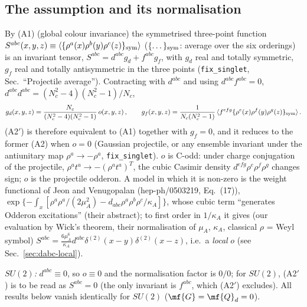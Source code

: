 \subsection{The assumption and its normalisation}\label{sec:dabc-ass}
\noindent By (A1) (global colour invariance) the symmetrised three-point function $S^{abc}(x,y,z)\equiv\langle\{\rho^{a}(x)\rho^{b}(y)\rho^{c}(z)\}_{\rm sym}\rangle$ ($\{\dots\}_{\rm sym}$: average over the six orderings) is an invariant tensor, $S^{abc}=d^{abc}g_{d}+f^{abc}g_{f}$, with $g_{d}$ real and totally symmetric, $g_{f}$ real and totally antisymmetric in the three points (\texttt{fix\_singlet}, Sec.~``Projectile average''). Contracting with $d^{abc}$ and using $d^{abc}f^{abc}=0$, $d^{abc}d^{abc}=(N_{c}^{2}-4)(N_{c}^{2}-1)/N_{c}$,
\begin{align}
g_{d}(x,y,z)=\frac{N_{c}}{(N_{c}^{2}-4)(N_{c}^{2}-1)}\,o(x,y,z)\,,\qquad g_{f}(x,y,z)=\frac{1}{N_{c}(N_{c}^{2}-1)}\,\langle f^{efg}\{\rho^{e}(x)\rho^{f}(y)\rho^{g}(z)\}_{\rm sym}\rangle\,.\label{eq:dabc-gdgf}
\end{align}
(A2$'$) is therefore equivalent to (A1) together with $g_{f}=0$, and it reduces to the former (A2) when $o=0$ (Gaussian projectile, or any ensemble invariant under the antiunitary map $\rho^{a}\to-\rho^{a}$, \texttt{fix\_singlet}). $o$ is C-odd: under charge conjugation of the projectile, $\rho^{a}t^{a}\to-(\rho^{a}t^{a})^{T}$, the cubic Casimir density $d^{efg}\rho^{e}\rho^{f}\rho^{g}$ changes sign; $o$ is the projectile odderon. A model in which it is non-zero is the weight functional of Jeon and Venugopalan (hep-ph/0503219, Eq.~(17)), $\exp\{-\int_{x}[\rho^{a}\rho^{a}/(2\mu_{A}^{2})-d_{abc}\rho^{a}\rho^{b}\rho^{c}/\kappa_{A}]\}$, whose cubic term ``generates Odderon excitations'' (their abstract); to first order in $1/\kappa_{A}$ it gives (our evaluation by Wick's theorem, their normalisation of $\mu_{A}$, $\kappa_{A}$, classical $\rho$ = Weyl symbol) $S^{abc}=\frac{6\mu_{A}^{6}}{\kappa_{A}}d^{abc}\delta^{(2)}(x-y)\delta^{(2)}(x-z)$, i.e.\ a \emph{local} $o$ (see Sec.~\ref{sec:dabc-local}).\par
\noindent\emph{$SU(2)$:} $d^{abc}\equiv0$, so $o\equiv0$ and the normalisation factor is $0/0$; for $SU(2)$, (A2$'$) is to be read as $S^{abc}=0$ (the only invariant is $f^{abc}$, which (A2$'$) excludes). All results below vanish identically for $SU(2)$ ($\mf{G}=\mf{Q}_{d}=0$).

